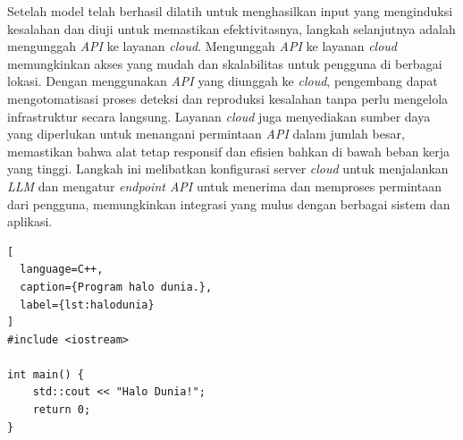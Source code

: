 Setelah model telah berhasil dilatih untuk menghasilkan 
input yang menginduksi kesalahan dan diuji untuk memastikan 
efektivitasnya, langkah selanjutnya adalah mengunggah 
\emph{API} ke layanan \emph{cloud}. Mengunggah \emph{API} 
ke layanan \emph{cloud} memungkinkan akses yang mudah dan 
skalabilitas untuk pengguna di berbagai lokasi. Dengan 
menggunakan \emph{API} yang diunggah ke \emph{cloud}, 
pengembang dapat mengotomatisasi proses deteksi dan 
reproduksi kesalahan tanpa perlu mengelola infrastruktur 
secara langsung. Layanan \emph{cloud} juga menyediakan 
sumber daya yang diperlukan untuk menangani permintaan 
\emph{API} dalam jumlah besar, memastikan bahwa alat 
tetap responsif dan efisien bahkan di bawah beban kerja 
yang tinggi. Langkah ini melibatkan konfigurasi server 
\emph{cloud} untuk menjalankan \emph{LLM} dan mengatur 
\emph{endpoint API} untuk menerima dan memproses permintaan 
dari pengguna, memungkinkan integrasi yang mulus dengan 
berbagai sistem dan aplikasi.

\begin{lstlisting}[
  language=C++,
  caption={Program halo dunia.},
  label={lst:halodunia}
]
#include <iostream>

int main() {
    std::cout << "Halo Dunia!";
    return 0;
}
\end{lstlisting}

\lipsum[2-3]





